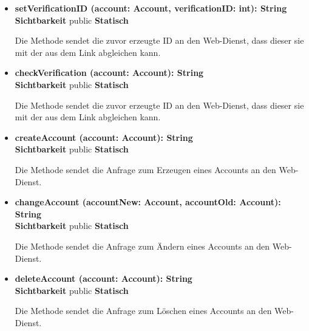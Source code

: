 \begin{itemize}
\item \textbf{setVerificationID (account: Account, verificationID: int): String}\hfill\\
\textbf{Sichtbarkeit} public \newline
\textbf{Statisch}

Die Methode sendet die zuvor erzeugte ID an den Web-Dienst, dass dieser sie mit der aus dem Link abgleichen kann.

\item \textbf{checkVerification (account: Account): String}\hfill\\
\textbf{Sichtbarkeit} public \newline
\textbf{Statisch}

Die Methode sendet die zuvor erzeugte ID an den Web-Dienst, dass dieser sie mit der aus dem Link abgleichen kann.

\item \textbf{createAccount (account: Account): String}\hfill\\
\textbf{Sichtbarkeit} public \newline
\textbf{Statisch}

Die Methode sendet die Anfrage zum Erzeugen eines Accounts an den Web-Dienst.

\item \textbf{changeAccount (accountNew: Account, accountOld: Account): String}\hfill\\
\textbf{Sichtbarkeit} public \newline
\textbf{Statisch}

Die Methode sendet die Anfrage zum Ändern eines Accounts an den Web-Dienst.

\item \textbf{deleteAccount (account: Account): String}\hfill\\
\textbf{Sichtbarkeit} public \newline
\textbf{Statisch}

Die Methode sendet die Anfrage zum Löschen eines Accounts an den Web-Dienst.

\end{itemize}
